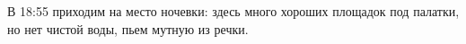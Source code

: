     В 18:55 приходим на место ночевки: здесь много хороших площадок под палатки, но нет чистой воды, пьем мутную
    из речки.

    \FloatBarrier
    






















